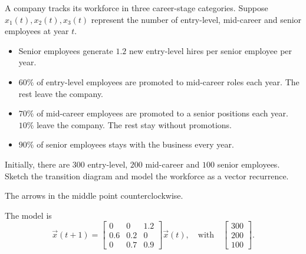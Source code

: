 \documentclass[../main.tex]{subfiles}
\begin{document}
\begin{exercise}
  A company tracks its workforce in three career-stage categories.
  Suppose \(x_{1}(t), x_{2}(t), x_{3}(t)\) represent the number of entry-level, mid-career and senior employees at year \(t\).  
  \begin{itemize}
    \item Senior employees generate \(1.2\) new entry-level hires per senior employee per year.
    \item \(60\%\) of entry-level employees are promoted to mid-career roles each year. The rest leave the company.
    \item \(70\%\) of mid-career employees are promoted to a senior positions each year. \(10\%\) leave the company. The rest stay without promotions.
    \item \(90\%\) of senior employees stays with the business every year.
  \end{itemize}
  Initially, there are \(300\) entry-level, \(200\) mid-career and \(100\) senior employees.  Sketch the transition diagram and model the workforce as a vector recurrence.

  \begin{solution}
    The arrows in the middle point counterclockwise.


    The model is 
    \[
      \vec{x}(t+1) = 
      \begin{bmatrix}
        0   & 0   & 1.2 \\
        0.6 & 0.2 & 0   \\
        0   & 0.7 & 0.9
      \end{bmatrix}
      \vec{x}(t),
      \quad\text{with}\quad
      \begin{bmatrix}
        300 \\
        200 \\
        100   
      \end{bmatrix}.
    \]
  \end{solution}
\end{exercise}
\end{document}
